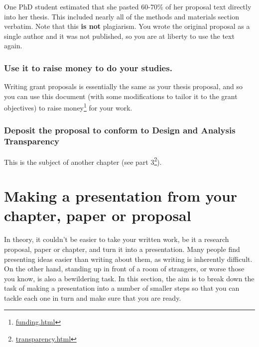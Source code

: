 \documentclass[
]{krantz}
\renewcommand{\href}[2]{#2\footnote{\url{#1}}}
\begin{document}
One PhD student estimated that she pasted 60-70\% of her proposal text directly into her thesis. This included nearly all of the methods and materials section verbatim. Note that this \textbf{is not} plagiarism. You wrote the original proposal as a single author and it was not published, so you are at liberty to use the text again.

\hypertarget{use-it-to-raise-money-to-do-your-studies.}{%
\subsubsection{Use it to raise money to do your studies.}\label{use-it-to-raise-money-to-do-your-studies.}}

Writing grant proposals is essentially the same as your thesis proposal, and so you can use this document (with some modifications to tailor it to the grant objectives) to \href{funding.html}{raise money} for your work.

\hypertarget{deposit-the-proposal-to-conform-to-design-and-analysis-transparency}{%
\subsubsection{Deposit the proposal to conform to Design and Analysis Transparency}\label{deposit-the-proposal-to-conform-to-design-and-analysis-transparency}}

This is the subject of another chapter (see \href{transparency.html}{part 3}).

\hypertarget{proposal-presentation}{%
\section{Making a presentation from your chapter, paper or proposal}\label{proposal-presentation}}

In theory, it couldn't be easier to take your written work, be it a research proposal, paper or chapter, and turn it into a presentation. Many people find presenting ideas easier than writing about them, as writing is inherently difficult. On the other hand, standing up in front of a room of strangers, or worse those you know, is also a bewildering task. In this section, the aim is to break down the task of making a presentation into a number of smaller steps so that you can tackle each one in turn and make sure that you are ready.
\end{document}
